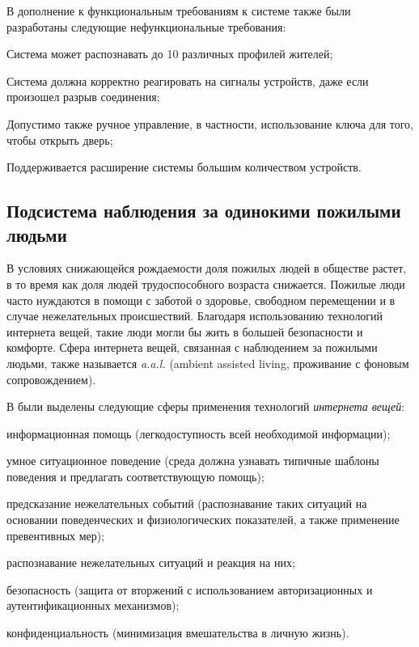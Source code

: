 В дополнение к функциональным требованиям к системе также были разработаны следующие нефункциональные требования:

\begin{textitemize}
	\item Система может распознавать до 10 различных профилей жителей;
	\item Система должна корректно реагировать на сигналы устройств, даже если произошел разрыв соединения;
	\item Допустимо также ручное управление, в частности, использование ключа для того, чтобы открыть дверь;
	\item Поддерживается расширение системы большим количеством устройств.
\end{textitemize}

\subsection{Подсистема наблюдения за одинокими пожилыми людьми}
\label{sec_SH_alone_building_control_subsystem}

В условиях снижающейся рождаемости доля пожилых людей в обществе растет, в то время как доля людей трудоспособного возраста снижается. Пожилые люди часто нуждаются в помощи с заботой о здоровье, свободном перемещении и в случае нежелательных происшествий. Благодаря использованию технологий интернета вещей, такие люди могли бы жить в большей безопасности и комфорте. Сфера интернета вещей, связанная с наблюдением за пожилыми людьми, также называется \textit{a.a.l.} (ambient assisted living, проживание с фоновым сопровождением).

В  были выделены следующие сферы применения технологий \textit{интернета вещей}:

\begin{textitemize}
	\item информационная помощь (легкодоступность всей необходимой информации);
	\item умное ситуационное поведение (среда должна узнавать типичные шаблоны поведения и предлагать соответствующую помощь);
	\item предсказание нежелательных событий (распознавание таких ситуаций на основании поведенческих и физиологических показателей, а также применение превентивных мер);
	\item распознавание нежелательных ситуаций и реакция на них;
	\item безопасность (защита от вторжений с использованием авторизационных и аутентификационных механизмов);
	\item конфиденциальность (минимизация вмешательства в личную жизнь).
\end{textitemize}

